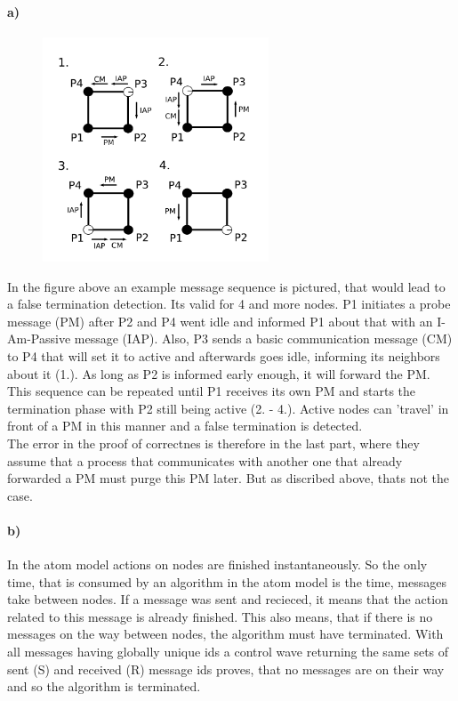 \documentclass[12pt,a4paper]{article}
\begin{document}
\paragraph*{a)} %
\begin{figure}[h]
\centering
 \includegraphics[width=0.6\textwidth]{2-2.png}
\end{figure}
In the figure above an example message sequence is pictured, that would lead to a false termination detection. Its valid for 4
and more nodes. P1 initiates a probe message (PM) after P2 and P4 went idle and informed P1 about that with an I-Am-Passive
message (IAP). Also, P3 sends a basic communication message (CM) to P4 that will set it to active and afterwards goes idle,
informing its neighbors about it (1.). As long as P2 is informed early enough, it will forward the PM. This sequence can be
repeated until P1 receives its own PM and starts the termination phase with P2 still being active (2. - 4.). Active nodes can
'travel' in front of a PM in this manner and a false termination is detected. \\
The error in the proof of correctnes is therefore in the last part, where they assume that a process that communicates with
another one that already forwarded a PM must purge this PM later. But as discribed above, thats not the case.
\paragraph{b)}
In the atom model actions on nodes are finished instantaneously. So the only time, that is consumed by an algorithm in the atom
model is the time, messages take between nodes. If a message was sent and recieced, it means that the action related to this
message is already finished. This also means, that if there is no messages on the way between nodes, the algorithm must have
terminated. With all messages having globally unique ids a control wave returning the same sets of sent (S) and received (R)
message ids proves, that no messages are on their way and so the algorithm is terminated.
\end{document}
